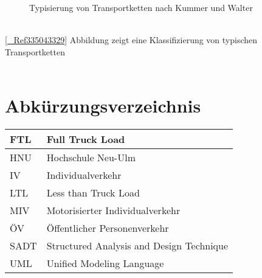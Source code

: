 \begin{figure}[htbp]
  \centering
  \caption{ Typisierung von Transportketten nach Kummer und Walter}
  \label{_Ref335043329}
\end{figure}
~\\
\autoref{_Ref335043329} Abbildung  zeigt eine Klassifizierung von typischen Transportketten  \autocites[][]{bib.562} \autocites[][]{bib.160}~\\

\newpage
~\\

% 
\section*{Abkürzungsverzeichnis}
\begin{table}[htbp]
  \centering
\begin{tabular}{|p{3cm}|p{3cm}|}\hline
FTL  & Full Truck Load\\\hline
HNU & Hochschule Neu-Ulm\\\hline
IV & Individualverkehr\\\hline
LTL & Less than Truck Load\\\hline
MIV & Motorisierter Individualverkehr\\\hline
ÖV & Öffentlicher Personenverkehr\\\hline
SADT  & Structured Analysis and Design Technique\\\hline
UML & Unified Modeling Language\\\hline
\end{tabular}
\end{table}

% 
